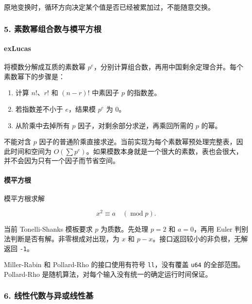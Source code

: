 原地变换时，循环方向决定某个值是否已经被累加过，不能随意交换。

\hypertarget{ux7d20ux6570ux5e42ux7ec4ux5408ux6570ux4e0eux6a21ux5e73ux65b9ux6839}{%
\subsubsection{5. 素数幂组合数与模平方根}\label{ux7d20ux6570ux5e42ux7ec4ux5408ux6570ux4e0eux6a21ux5e73ux65b9ux6839}}

\hypertarget{exlucas}{%
\paragraph{exLucas}\label{exlucas}}

将模数分解成互质的素数幂 \(p^e\)，分别计算组合数，再用中国剩余定理合并。每个素数幂下的步骤是：

\begin{enumerate}
\def\labelenumi{\arabic{enumi}.}
\tightlist
\item
  计算 \(n!\)、\(r!\) 和 \((n-r)!\) 中素因子 \(p\) 的指数差。
\item
  若指数差不小于 \(e\)，结果模 \(p^e\) 为 \(0\)。
\item
  从阶乘中去掉所有 \(p\) 因子，对剩余部分求逆，再乘回所需的 \(p\) 的幂。
\end{enumerate}

不能对含 \(p\) 因子的普通阶乘直接求逆。当前实现为每个素数幂预处理完整表，因此时间和空间为 \(O\!\left(\sum p^e\right)\)。如果模数本身就是一个很大的素数，表也会很大，并不会因为只有一个因子而节省空间。

\hypertarget{ux6a21ux5e73ux65b9ux6839}{%
\paragraph{模平方根}\label{ux6a21ux5e73ux65b9ux6839}}

模平方根求解

\[
x^2\equiv a\quad(\operatorname{mod} p).
\]

当前 Tonelli-Shanks 模板要求 \(p\) 为质数。先处理 \(p=2\) 和 \(a=0\)，再用 Euler 判别法判断是否有解。非零根成对出现，为 \(x\) 和 \(p-x\)。接口返回较小的非负根，无解返回 \passthrough{\lstinline!-1!}。

Miller-Rabin 和 Pollard-Rho 的接口使用有符号 \passthrough{\lstinline!ll!}，没有覆盖 \passthrough{\lstinline!u64!} 的全部范围。Pollard-Rho 是随机算法，对每个输入没有统一的确定运行时间保证。

\hypertarget{ux7ebfux6027ux4ee3ux6570ux4e0eux5f02ux6216ux7ebfux6027ux57fa}{%
\subsubsection{6. 线性代数与异或线性基}\label{ux7ebfux6027ux4ee3ux6570ux4e0eux5f02ux6216ux7ebfux6027ux57fa}}

